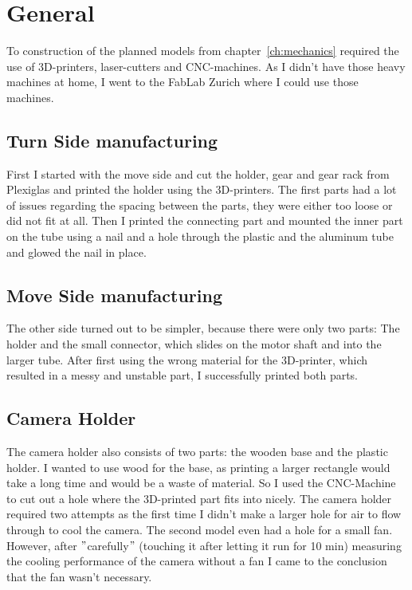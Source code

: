\section{General}\label{sec:general3}
To construction of the planned models from chapter~\ref{ch:mechanics} required the use of 3D-printers, laser-cutters and CNC-machines.
As I didn't have those heavy machines at home, I went to the FabLab Zurich\autocite{fablab} where I could use those machines.

\subsection{Turn Side manufacturing}\label{subsec:turn-side-manufacturing}
First I started with the move side and cut the holder, gear and gear rack from Plexiglas and printed the holder using the 3D-printers.
The first parts had a lot of issues regarding the spacing between the parts, they were either too loose or did not fit at all.
Then I printed the connecting part and mounted the inner part on the tube using a nail and a hole through the plastic and the aluminum tube and glowed the nail in place.

\subsection{Move Side manufacturing}\label{subsec:move-side-manufacturing}
The other side turned out to be simpler, because there were only two parts: The holder and the small connector, which slides on the motor shaft and into the larger tube.
After first using the wrong material for the 3D-printer, which resulted in a messy and unstable part, I successfully printed both parts.

\subsection{Camera Holder}\label{subsec:camera-holder}
The camera holder also consists of two parts: the wooden base and the plastic holder.
I wanted to use wood for the base, as printing a larger rectangle would take a long time and would be a waste of material.
So I used the CNC-Machine to cut out a hole where the 3D-printed part fits into nicely.
The camera holder required two attempts as the first time I didn't make a larger hole for air to flow through to cool the camera.
The second model even had a hole for a small fan.
However, after \("\)carefully\("\) (touching it after letting it run for 10 min) measuring the cooling performance of the camera without a fan I came to the conclusion that the fan wasn't necessary.

